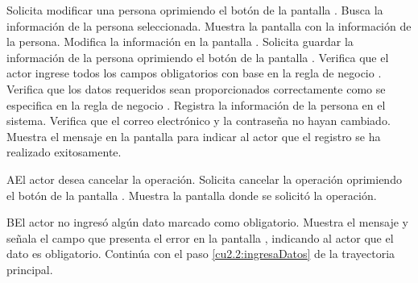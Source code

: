  \begin{UCtrayectoria}
    \UCpaso[\UCactor] Solicita modificar una persona oprimiendo el botón \btnEditar de la pantalla .
    \UCpaso[\UCsist] Busca la información de la persona seleccionada.
    \UCpaso[\UCsist] Muestra la pantalla  con la información de la persona. 
    \UCpaso[\UCactor] Modifica la información en la pantalla . \label{cu2.2:ingresaDatos}
    \UCpaso[\UCactor] Solicita guardar la información de la persona oprimiendo el botón  de la pantalla .  
    \UCpaso[\UCsist] Verifica que el actor ingrese todos los campos obligatorios con base en la regla de negocio  . 
    \UCpaso[\UCsist] Verifica que los datos requeridos sean proporcionados correctamente como se especifica en la regla de negocio .  
    \UCpaso[\UCsist] Registra la información de la persona en el sistema.
    \UCpaso[\UCsist] Verifica que el correo electrónico y la contraseña no hayan cambiado. 
    \UCpaso[\UCsist] Muestra el mensaje  en la pantalla 
    para indicar al actor que el registro se ha realizado exitosamente. \label{cu2.2:muestraMensaje}
 \end{UCtrayectoria}
 \begin{UCtrayectoriaA}{A}{El actor desea cancelar la operación.}
    \UCpaso[\UCactor] Solicita cancelar la operación oprimiendo el botón  de la pantalla .
    \UCpaso[\UCsist] Muestra la pantalla donde se solicitó la operación.
 \end{UCtrayectoriaA} 
 \begin{UCtrayectoriaA}{B}{El actor no ingresó algún dato marcado como obligatorio.}
    \UCpaso[\UCsist] Muestra el mensaje  y señala el campo que presenta el error en la pantalla 
	    , indicando al actor que el dato es obligatorio.
    \UCpaso[] Continúa con el paso \ref{cu2.2:ingresaDatos} de la trayectoria principal.
 \end{UCtrayectoriaA}

